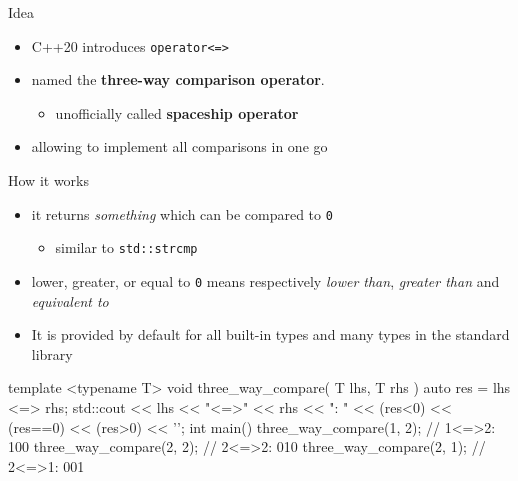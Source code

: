 \begin{frame}[fragile]
  \begin{block}{Idea}
    \begin{itemize}
    \item C++20 introduces \texttt{operator<=>}
    \item named the \textbf{three-way comparison operator}.
      \begin{itemize}
      \item unofficially called \textbf{spaceship operator}
      \end{itemize}
    \item allowing to implement all comparisons in one go
    \end{itemize}
  \end{block}
  \begin{exampleblock}{How it works}
    \begin{itemize}
    \item it returns \emph{something} which can be compared to \texttt{0}
      \begin{itemize}
      \item similar to \texttt{std::strcmp}
      \end{itemize}
    \item lower, greater, or equal to \texttt{0} means respectively \emph{lower than}, \emph{greater than} and \emph{equivalent to}
    \item It is provided by default for all built-in types and many types in the standard library
    \end{itemize}
  \end{exampleblock}
\end{frame}

\begin{frame}[fragile]
  \begin{exampleblock}{}
    \begin{cppcode*}{}
    template <typename T>
    void three_way_compare( T lhs, T rhs ) {
      auto res = lhs <=> rhs;
      std::cout << lhs << "<=>" << rhs << ": "
                << (res<0) << (res==0) << (res>0)
                << '\n';
    }
    int main() {
      three_way_compare(1, 2); // 1<=>2: 100
      three_way_compare(2, 2); // 2<=>2: 010
      three_way_compare(2, 1); // 2<=>1: 001
    }
    \end{cppcode*}
  \end{exampleblock}
\end{frame}

